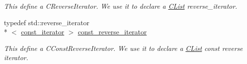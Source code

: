 \begin{DoxyCompactItemize}
\begin{DoxyCompactList}\small\item\em This define a {\ttfamily C\+Reverse\+Iterator}. We use it to declare a \hyperlink{classnsSdD_1_1CList}{C\+List} reverse\+\_\+iterator. \end{DoxyCompactList}\item 
\hypertarget{classnsSdD_1_1CList_a43f361676af43c355821d20da82ad401}{typedef std\+::reverse\+\_\+iterator\\*
$<$ \hyperlink{classnsSdD_1_1CList_ae323732a26e507146686556fb775767a}{const\+\_\+iterator} $>$ \hyperlink{classnsSdD_1_1CList_a43f361676af43c355821d20da82ad401}{const\+\_\+reverse\+\_\+iterator}}\label{classnsSdD_1_1CList_a43f361676af43c355821d20da82ad401}

\begin{DoxyCompactList}\small\item\em This define a {\ttfamily C\+Const\+Reverse\+Iterator}. We use it to declare a \hyperlink{classnsSdD_1_1CList}{C\+List} const reverse iterator. \end{DoxyCompactList}\end{DoxyCompactItemize}
